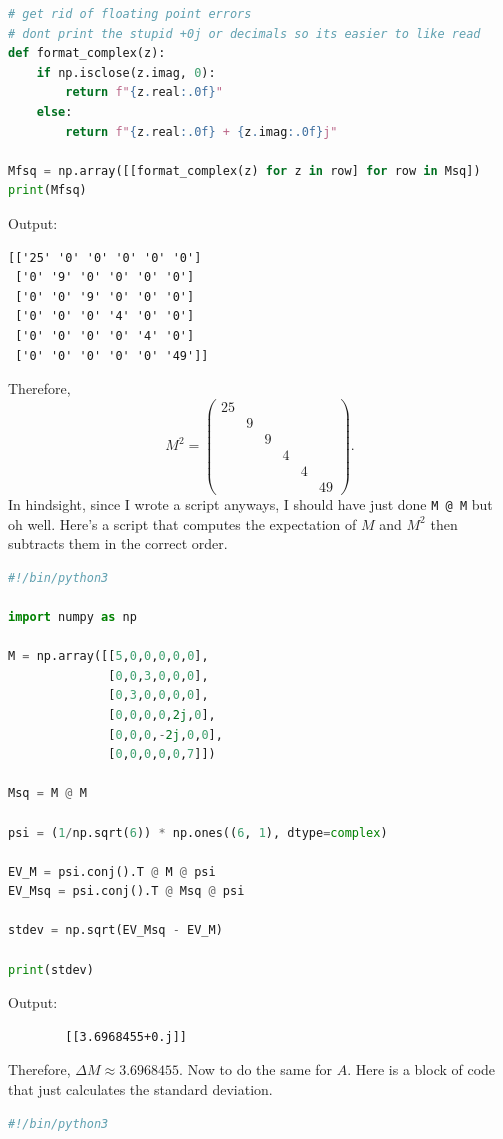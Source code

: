 \documentclass[11pt, letterpaper]{article}
\begin{document}
\begin{enumerate}
\begin{lstlisting}[language=Python]
# get rid of floating point errors
# dont print the stupid +0j or decimals so its easier to like read
def format_complex(z):
    if np.isclose(z.imag, 0):
        return f"{z.real:.0f}"
    else:
        return f"{z.real:.0f} + {z.imag:.0f}j"

Mfsq = np.array([[format_complex(z) for z in row] for row in Msq])
print(Mfsq)
\end{lstlisting}
		Output:
		\begin{lstlisting}
[['25' '0' '0' '0' '0' '0']
 ['0' '9' '0' '0' '0' '0']
 ['0' '0' '9' '0' '0' '0']
 ['0' '0' '0' '4' '0' '0']
 ['0' '0' '0' '0' '4' '0']
 ['0' '0' '0' '0' '0' '49']]
\end{lstlisting}
		Therefore,
		\[
			M^2=\begin{pmatrix}
			25 &  &  &  &  &  \\
			 & 9 &  &  &  &  \\
			 &  & 9 &  &  &  \\
			 &  &  & 4 &  &  \\
			 &  &  &  & 4 &  \\
			 &  &  &  &  & 49
			\end{pmatrix}
		.\]
	In hindsight, since I wrote a script anyways, I should have just done \verb|M @ M| but oh well. Here's a script that computes the expectation of $M$ and $M^2$ then subtracts them in the correct order.
	\begin{lstlisting}[language=Python]	
#!/bin/python3

import numpy as np

M = np.array([[5,0,0,0,0,0],
              [0,0,3,0,0,0],
              [0,3,0,0,0,0],
              [0,0,0,0,2j,0],
              [0,0,0,-2j,0,0],
              [0,0,0,0,0,7]])

Msq = M @ M 

psi = (1/np.sqrt(6)) * np.ones((6, 1), dtype=complex)

EV_M = psi.conj().T @ M @ psi
EV_Msq = psi.conj().T @ Msq @ psi 

stdev = np.sqrt(EV_Msq - EV_M)

print(stdev)
\end{lstlisting}
	Output:
	\begin{lstlisting}
		[[3.6968455+0.j]]
\end{lstlisting}
	Therefore, $\Delta M \approx 3.6968455$. Now to do the same for $A$. Here is a block of code that just calculates the standard deviation.
	\begin{lstlisting}[language=Python]	
#!/bin/python3


\end{lstlisting}
\end{enumerate}
\end{document}

